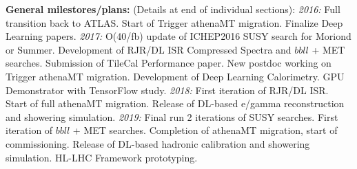 


{\bf General milestores/plans:} (Details at end of individual
sections): {\em 2016:} Full transition back to ATLAS. Start of Trigger
athenaMT migration. Finalize Deep Learning papers. {\em 2017:} O(40/fb)
update of ICHEP2016 SUSY search for Moriond or Summer. Development of
RJR/DL ISR Compressed Spectra and $bbll$ + MET searches. Submission of
TileCal Performance paper. New postdoc working on Trigger athenaMT
migration. Development of Deep Learning Calorimetry. GPU Demonstrator
with TensorFlow study. {\em 2018:} First iteration of RJR/DL ISR. Start of
full athenaMT migration. Release of DL-based e/gamma reconstruction
and showering simulation.  {\em 2019:} Final run 2 iterations of SUSY
searches. First iteration of $bbll$ + MET searches. Completion of
athenaMT migration, start of commissioning.  Release of DL-based
hadronic calibration and showering simulation. HL-LHC Framework
prototyping.





